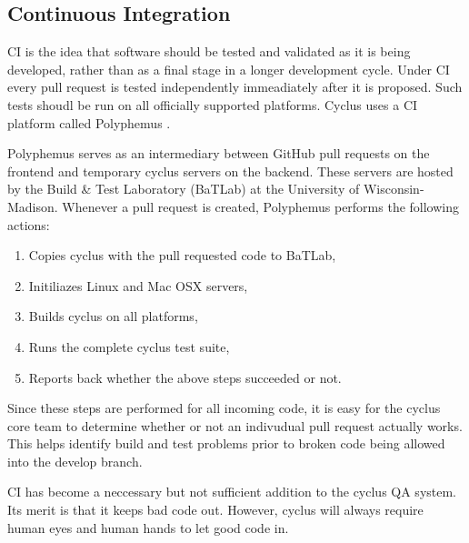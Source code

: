 \subsection{Continuous Integration}
\label{sec:qa-ci}

\gls{CI} is the idea that software should be tested and validated 
as it is being developed, rather than as a final stage in a longer development 
cycle.  Under \gls{CI} every pull request is tested independently immeadiately after 
it is proposed. Such tests shoudl be run on all officially supported platforms. 
Cyclus uses a \gls{CI} platform called Polyphemus \cite{scopatz_polyphemus_2014}. 

Polyphemus serves as an intermediary between GitHub pull requests on the frontend 
and temporary cyclus servers on the backend. These servers are hosted by 
the Build \& Test Laboratory (BaTLab) \cite{uw_batlab_team_batlab_2014} at the University of 
Wisconsin-Madison. Whenever a pull request is created, Polyphemus performs 
the following actions:

\begin{enumerate}
    \item Copies cyclus with the pull requested code to BaTLab,
    \item Initiliazes Linux and Mac OSX servers,
    \item Builds cyclus on all platforms,
    \item Runs the complete cyclus test suite, 
    \item Reports back whether the above steps succeeded or not.
\end{enumerate}

Since these steps are performed for all incoming code, it is easy for the 
cyclus core team to determine whether or not an indivudual pull request 
actually works. This helps identify build and test problems prior to 
broken code being allowed into the develop branch.

\gls{CI} has become a neccessary but not sufficient addition to the cyclus QA
system. Its merit is that it keeps bad code out. However, cyclus will always
require human eyes and human hands to let good code in.


